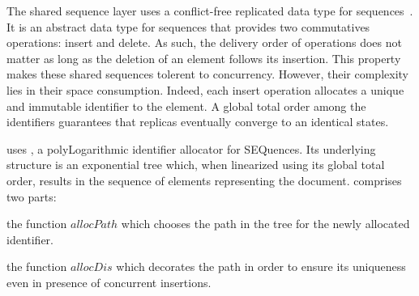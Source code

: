 \begin{asparadesc}
\item [The shared sequence layer] uses a conflict-free replicated data type for
  sequences~\cite{shapiro2011comprehensive, shapiro2011conflict}. It is an
  abstract data type for sequences that provides two commutatives operations:
  insert and delete. As such, the delivery order of operations does not matter
  as long as the deletion of an element follows its insertion. This property
  makes these shared sequences tolerent to concurrency. However, their
  complexity lies in their space consumption. Indeed, each insert operation
  allocates a unique and immutable identifier to the element. A global total
  order among the identifiers guarantees that replicas eventually converge to an
  identical states.

  \CRATE uses \LSEQ, a polyLogarithmic identifier allocator for SEQuences. Its
  underlying structure is an exponential tree which, when linearized using its
  global total order, results in the sequence of elements representing the
  document. \LSEQ comprises two parts:
  \begin{inparaenum}[(i)]
  \item the function $allocPath$ which chooses the path in the tree for the
    newly allocated identifier.
  \item the function $allocDis$ which decorates the path in order to ensure its
    uniqueness even in presence of concurrent insertions.
  \end{inparaenum}


\end{asparadesc}
